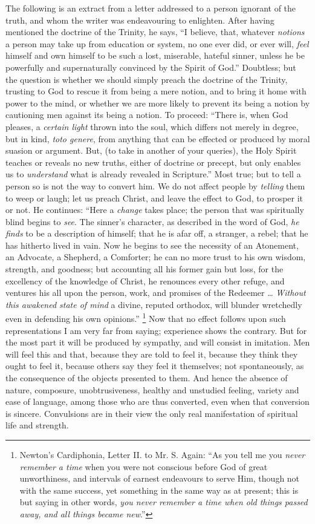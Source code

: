 The following is an extract from a letter addressed to a person
ignorant of the truth, and whom the writer was endeavouring to
enlighten. After having mentioned the doctrine of the Trinity, he
says, ``I believe, that, whatever \emph{notions} a person may take
up from education or system, no one ever did, or ever will, \emph{feel}
himself and own himself to be such a lost, miserable, hateful sinner,
unless he be powerfully and supernaturally convinced by the
Spirit of God.'' Doubtless; but the question is whether we should
simply preach the doctrine of the Trinity, trusting to God to rescue
it from being a mere notion, and to bring it home with power to the
mind, or whether we are more likely to prevent its being a notion by
cautioning men against its being a notion. To proceed: ``There is,
when God pleases, a \emph{certain light} thrown into the soul, which
differs not merely in degree, but in kind, \emph{toto genere}, from
anything that can be effected or produced by moral suasion or
argument. But, (to take in another of your queries), the Holy Spirit
teaches or reveals no new truths, either of doctrine or precept, but
only enables us to \emph{understand} what is already revealed in
Scripture.'' Most true; but to tell a person so is not the way to
convert him. We do not affect people by \emph{telling} them to weep or
laugh; let us preach Christ, and leave the effect to God, to prosper
it or not. He continues: ``Here a \emph{change} takes place; the
person that was spiritually blind begins to \emph{see}. The sinner's
character, as described in the word of God, \emph{he finds} to be a
description of himself; that he is afar off, a stranger, a rebel; that
he has hitherto lived in vain. Now he begins to see the necessity of
an Atonement, an Advocate, a Shepherd, a Comforter; he can no more
trust to his own wisdom, strength, and goodness; but accounting all
his former gain but loss, for the excellency of the knowledge of
Christ, he renounces every other refuge, and ventures his all upon the
person, work, and promises of the Redeemer … \emph{Without this
awakened state of mind} a divine, reputed orthodox, will blunder
wretchedly even in defending his own opinions.'' \footnote{Newton's Cardiphonia, Letter II. to Mr. S. Again: ``As you
tell me you \emph{never remember a time} when you were not conscious
before God of great unworthiness, and intervals of earnest endeavours
to serve Him, though not with the same success, yet something in the
same way as at present; this is but saying in other words, \emph{you
never remember a time when old things passed away, and all things
became new}.''} Now that no effect follows upon such representations I am very
far from saying; experience shows the contrary. But for the most part
it will be produced by sympathy, and will consist in imitation. Men
will feel this and that, because they are told to feel it, because
they think they ought to feel it, because others say they feel it
themselves; not spontaneously, as the consequence of the objects
presented to them. And hence the absence of nature, composure,
unobtrusiveness, healthy and unstudied feeling, variety and ease of
language, among those who are thus converted, even when that
conversion is sincere. Convulsions are in their view the only real
manifestation of spiritual life and strength.

